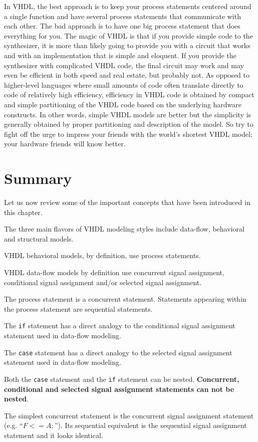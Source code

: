 In VHDL, the best approach is to keep your process statements centered around a single function and have several process statements that communicate with each other. The bad approach is to have one big process statement that does everything for you. The magic of VHDL is that if you provide simple code to the synthesizer, it is more than likely going to provide you with a circuit that works and with an implementation that is simple and eloquent. If you provide the synthesizer with complicated VHDL code, the final circuit may work and may even be efficient in both speed and real estate, but probably not. As opposed to higher-level languages where small amounts of code often translate directly to code of relatively high efficiency, efficiency in VHDL code is obtained by compact and simple partitioning of the VHDL code based on the underlying hardware constructs. In other words, simple VHDL models are better but the simplicity is generally obtained by proper partitioning and description of the model. So try to fight off the urge to impress your friends with the world's shortest VHDL model; your hardware friends will know better.
\section{Summary}
Let us now review some of the important concepts that have been introduced in this chapter.
\begin{my_list}
\item The three main flavors of VHDL modeling styles include data-flow, behavioral and structural models.
\item VHDL behavioral models, by definition, use process statements.
\item VHDL data-flow models by definition use concurrent signal assignment, conditional signal assignment and/or selected signal assignment.
\item The process statement is a concurrent statement. Statements appearing within the process statement are sequential statements.
\item The \texttt{if} statement has a direct analogy to the conditional signal assignment statement used in data-flow modeling.
\item The \texttt{case} statement has a direct analogy to the selected signal assignment statement used in data-flow modeling.
\item Both the \texttt{case} statement and the \texttt{if} statement can be nested. \textbf{Concurrent, conditional and selected signal assignment statements can not be nested}.
\item The simplest concurrent statement is the concurrent signal assignment statement (e.g. ``{\footnotesize$F <= A;$}''). Its sequential equivalent is the sequential signal assignment statement and it looks identical.
\end{my_list}


